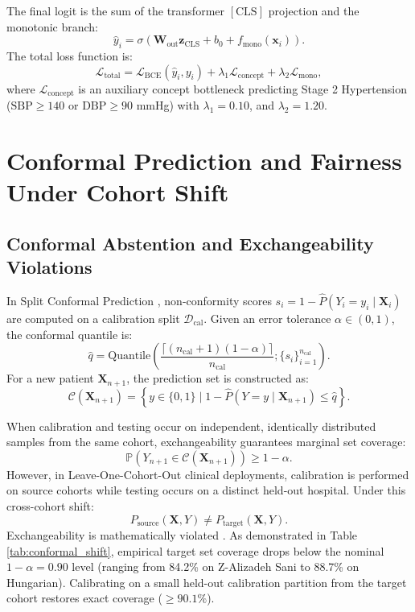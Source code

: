 \documentclass[journal]{IEEEtran}
\begin{document}
The final logit is the sum of the transformer $[\text{CLS}]$ projection and the monotonic branch:
\begin{equation}
\hat{y}_i = \sigma\left( \mathbf{W}_{\text{out}} \mathbf{z}_{\text{CLS}} + b_0 + f_{\text{mono}}(\mathbf{x}_i) \right).
\end{equation}
The total loss function is:
\begin{equation}
\mathcal{L}_{\text{total}} = \mathcal{L}_{\text{BCE}}(\hat{y}_i, y_i) + \lambda_1 \mathcal{L}_{\text{concept}} + \lambda_2 \mathcal{L}_{\text{mono}},
\end{equation}
where $\mathcal{L}_{\text{concept}}$ is an auxiliary concept bottleneck predicting Stage 2 Hypertension ($\text{SBP} \ge 140$ or $\text{DBP} \ge 90$ mmHg) with $\lambda_1 = 0.10$, and $\lambda_2 = 1.20$.

\section{Conformal Prediction and Fairness Under Cohort Shift}

\subsection{Conformal Abstention and Exchangeability Violations}
In Split Conformal Prediction \cite{vovk2005, angelopoulos2023}, non-conformity scores $s_i = 1 - \hat{P}(Y_i = y_i \mid \mathbf{X}_i)$ are computed on a calibration split $\mathcal{D}_{\text{cal}}$. Given an error tolerance $\alpha \in (0, 1)$, the conformal quantile is:
\begin{equation}
\hat{q} = \text{Quantile}\left( \frac{\lceil (n_{\text{cal}} + 1)(1 - \alpha) \rceil}{n_{\text{cal}}}; \{s_i\}_{i=1}^{n_{\text{cal}}} \right).
\end{equation}
For a new patient $\mathbf{X}_{n+1}$, the prediction set is constructed as:
\begin{equation}
\mathcal{C}(\mathbf{X}_{n+1}) = \left\{ y \in \{0, 1\} \mid 1 - \hat{P}(Y = y \mid \mathbf{X}_{n+1}) \le \hat{q} \right\}.
\end{equation}

When calibration and testing occur on independent, identically distributed samples from the same cohort, exchangeability guarantees marginal set coverage:
\begin{equation}
\mathbb{P}(Y_{n+1} \in \mathcal{C}(\mathbf{X}_{n+1})) \ge 1 - \alpha.
\end{equation}
However, in Leave-One-Cohort-Out clinical deployments, calibration is performed on source cohorts while testing occurs on a distinct held-out hospital. Under this cross-cohort shift:
\begin{equation}
P_{\text{source}}(\mathbf{X}, Y) \neq P_{\text{target}}(\mathbf{X}, Y).
\end{equation}
Exchangeability is mathematically violated \cite{tibshirani2019, barber2021}. As demonstrated in Table \ref{tab:conformal_shift}, empirical target set coverage drops below the nominal $1-\alpha = 0.90$ level (ranging from 84.2\% on Z-Alizadeh Sani to 88.7\% on Hungarian). Calibrating on a small held-out calibration partition from the target cohort restores exact coverage ($\ge 90.1\%$).
\end{document}

